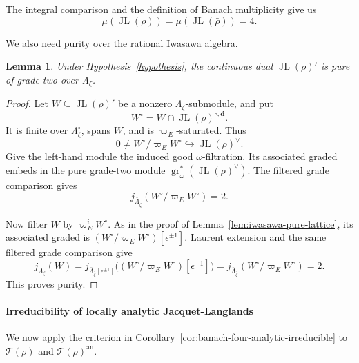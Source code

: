 \documentclass[11pt]{article}
\newtheorem{lemma}[theorem]{Lemma}
\theoremstyle{definition}
\newcommand{\gr}{\operatorname{gr}}
\newcommand{\JL}{\operatorname{JL}}
\newcommand{\Tau}{\mathcal T}
\begin{document}
The integral comparison and the definition of Banach multiplicity give us
\[
 \mu(\JL(\rho))=\mu(\JL(\bar\rho))=4.
\]

We also need purity over the rational Iwasawa algebra.

\begin{lemma}\label{lem:jl-iwasawa-pure}
Under Hypothesis~\ref{hypothesis}, the continuous dual
$\JL(\rho)'$ is pure of grade two over $\Lambda_\zeta$.
\end{lemma}
\begin{proof}
Let $W\subseteq\JL(\rho)'$ be a nonzero
$\Lambda_\zeta$-submodule, and put
\[
 W^\circ=W\cap\JL(\rho)^{\circ,\mathbf d}.
\]
It is finite over $\Lambda_\zeta^\circ$, spans $W$, and is
$\varpi_E$-saturated. Thus
\[
 0\ne W^\circ/\varpi_EW^\circ
 \hookrightarrow\JL(\bar\rho)^\vee.
\]
Give the left-hand module the induced good $\omega$-filtration.
Its associated graded embeds in the pure grade-two module
$\gr_\omega^*(\JL(\bar\rho)^\vee)$. The filtered grade comparison
\cite[Chapter~III, Theorem~2.5.2]{LvO96} gives
\[
 j_{\overline\Lambda_{\bar\zeta}}
       (W^\circ/\varpi_EW^\circ)=2.
\]

Now filter $W$ by $\varpi_E^iW^\circ$. As in the proof of
Lemma~\ref{lem:iwasawa-pure-lattice}, its associated graded is
$(W^\circ/\varpi_EW^\circ)[\epsilon^{\pm1}]$.
Laurent extension and the same filtered grade comparison give
\[
 j_{\Lambda_\zeta}(W)
 =j_{\overline\Lambda_{\bar\zeta}[\epsilon^{\pm1}]}
      \bigl((W^\circ/\varpi_EW^\circ)[\epsilon^{\pm1}]\bigr)
 =j_{\overline\Lambda_{\bar\zeta}}
      (W^\circ/\varpi_EW^\circ)=2.
\]
This proves purity.
\end{proof}

\paragraph{Irreducibility of locally analytic Jacquet-Langlands}
\label{sec:analytic-irreducibility}

We now apply the criterion in Corollary~\ref{cor:banach-four-analytic-irreducible} to $\Tau(\rho)$ and $\Tau(\rho)^{\mathrm{an}}$.
\end{document}

